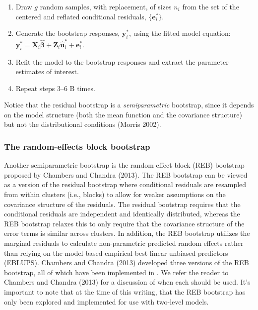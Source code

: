 \begin{enumerate}
\item
  Draw \(g\) random samples, with replacement, of sizes \(n_i\) from the set of the centered and reflated conditional residuals, \(\lbrace \boldsymbol{e}_i^* \rbrace\).
\item
  Generate the bootstrap responses, \(\boldsymbol{y}^*_i\), using the fitted model equation: \(\boldsymbol{y}^*_i = \boldsymbol{X}_i \widehat{\boldsymbol{\beta}} + \boldsymbol{Z}_i \widehat{\boldsymbol{u}}^*_i + \boldsymbol{e}_i^*\).
\item
  Refit the model to the bootstrap responses and extract the parameter
  estimates of interest.
\item
  Repeat steps 3--6 B times.
\end{enumerate}

Notice that the residual bootstrap is a \emph{semiparametric} bootstrap, since it depends on the model structure (both the mean function and the covariance structure) but not the distributional conditions (Morris 2002).

\hypertarget{the-random-effects-block-bootstrap}{%
\subsubsection{The random-effects block bootstrap}\label{the-random-effects-block-bootstrap}}

Another semiparametric bootstrap is the random effect block (REB) bootstrap proposed by Chambers and Chandra (2013). The REB bootstrap can be viewed as a version of the residual bootstrap where conditional residuals are resampled from within clusters (i.e., blocks) to allow for weaker assumptions on the covariance structure of the residuals. The residual bootstrap requires that the conditional residuals are independent and identically distributed, whereas the REB bootstrap relaxes this to only require that the covariance structure of the error terms is similar across clusters. In addition, the REB bootstrap utilizes the marginal residuals to calculate non-parametric predicted random effects rather than relying on the model-based empirical best linear unbiased predictors (EBLUPS). Chambers and Chandra (2013) developed three versions of the REB bootstrap, all of which have been implemented in . We refer the reader to Chambers and Chandra (2013) for a discussion of when each should be used. It's important to note that at the time of this writing, that the REB bootstrap has only been explored and implemented for use with two-level models.

